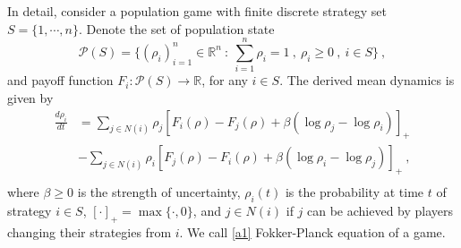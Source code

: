 \documentclass[11pt,reqno]{amsart}
\begin{document}
In detail, consider a population game with finite discrete strategy set $S=\{1,\cdots, n\}$. Denote the set of population state  
\begin{equation*}
\mathcal{P}(S)=\{(\rho_i)_{i=1}^n\in \mathbb{R}^n~:~ \sum_{i=1}^n\rho_i=1\ ,~\rho_i\geq 0\ ,~i\in S\}\ ,
\end{equation*}
and payoff function $F_i\colon \mathcal{P}(S)\rightarrow \mathbb{R}$, for any $i\in S$. The derived mean dynamics is given by
\begin{equation}\label{a1}
\begin{split}
\frac{ d\rho_i}{dt}&=\sum_{j\in N(i)} \rho_j[ F_i(\rho)- F_j(\rho)+\beta(\log\rho_j-\log\rho_i)]_+\\
&-\sum_{j\in N(i)}\rho_{i}[ F_j(\rho)- F_i(\rho)+\beta(\log\rho_i-\log\rho_j)]_+ \ ,\\
\end{split}
\end{equation}
where $\beta\geq 0$ is the strength of uncertainty, $\rho_i(t)$ is the probability at time $t$ of strategy $i\in S$, $[\cdot]_+=\max\{\cdot,0\}$, and $j\in N(i)$ if $j$ can be achieved by players changing their strategies from $i$. We call \eqref{a1} Fokker-Planck equation of a game.
\end{document}

